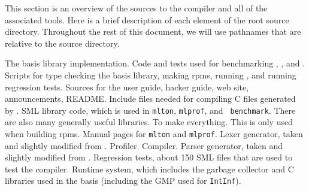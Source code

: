 
This section is an overview of the sources to the compiler and all of the
associated tools.  Here is a brief description of each element of the root
source directory.  Throughout the rest of this document, we will use pathnames
that are relative to the source directory.

\begin{description}

The basis library implementation.
Code and tests used for benchmarking {\mlton}, {\smlnj}, and {\mosml}.
Scripts for type checking the basis library, making rpms, running {\mlton}, and
running regression tests.
Sources for the user guide, hacker guide, web site, announcements, README.
Include files needed for compiling C files generated by {\mlton}.
SML library code, which is used in {\tt mlton}, {\tt mlprof}, and {\tt
benchmark}.  There are also many generally useful libraries.
To make everything.  This is only used when building rpms.
Manual pages for {\tt mlton} and {\tt mlprof}.
Lexer generator, taken and slightly modified from {\smlnj}.
Profiler.
Compiler.
Parser generator, taken and slightly modified from {\smlnj}.
Regression tests, about 150 SML files that are used to test the compiler.
Runtime system, which includes the garbage collector and C libraries used in
the basis (including the GMP used for {\tt IntInf}).

\end{description}
